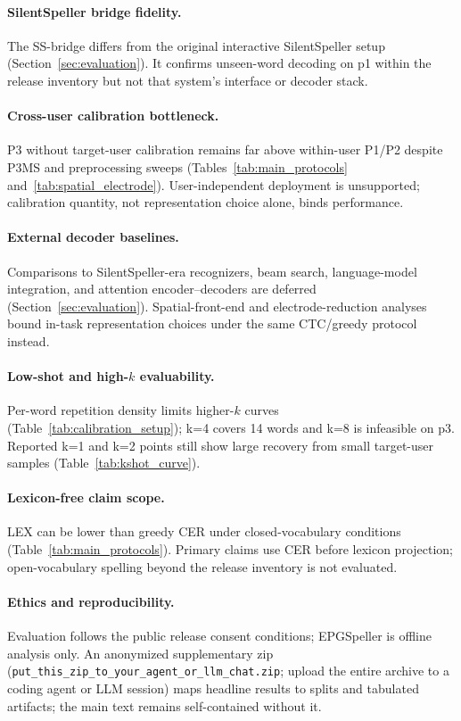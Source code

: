 \paragraph{SilentSpeller bridge fidelity.}
The SS-bridge differs from the original interactive SilentSpeller setup (Section~\ref{sec:evaluation}).
It confirms unseen-word decoding on p1 within the release inventory but not that system's interface or decoder stack.

\paragraph{Cross-user calibration bottleneck.}
P3 without target-user calibration remains far above within-user P1/P2 despite P3MS and preprocessing sweeps (Tables~\ref{tab:main_protocols} and~\ref{tab:spatial_electrode}).
User-independent deployment is unsupported; calibration quantity, not representation choice alone, binds performance.

\paragraph{External decoder baselines.}
Comparisons to SilentSpeller-era recognizers, beam search, language-model integration, and attention encoder--decoders are deferred (Section~\ref{sec:evaluation}).
Spatial-front-end and electrode-reduction analyses bound in-task representation choices under the same CTC/greedy protocol instead.

\paragraph{Low-shot and high-$k$ evaluability.}
Per-word repetition density limits higher-$k$ curves (Table~\ref{tab:calibration_setup}); k=4 covers 14 words and k=8 is infeasible on p3.
Reported k=1 and k=2 points still show large recovery from small target-user samples (Table~\ref{tab:kshot_curve}).

\paragraph{Lexicon-free claim scope.}
LEX can be lower than greedy CER under closed-vocabulary conditions (Table~\ref{tab:main_protocols}).
Primary claims use CER before lexicon projection; open-vocabulary spelling beyond the release inventory is not evaluated.

\paragraph{Ethics and reproducibility.}
Evaluation follows the public release consent conditions; EPGSpeller is offline analysis only.
An anonymized supplementary zip (\texttt{put\_this\_zip\_to\_your\_agent\_or\_llm\_chat.zip}; upload the entire archive to a coding agent or LLM session) maps headline results to splits and tabulated artifacts; the main text remains self-contained without it.
